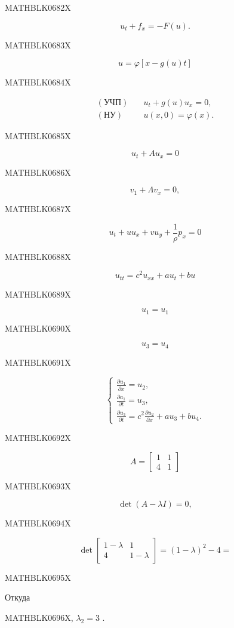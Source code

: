 \documentclass[
  ukrainian,
]{article}
\begin{document}
MATHBLK0682X

\[
u_t + f_x = -F(u).
\]

MATHBLK0683X

\[
u = \varphi[x-g(u)t]
\]

MATHBLK0684X

\[
\begin{aligned}
(\text{УЧП})\quad & u_t + g(u)u_x = 0,\\
(\text{НУ})\quad & u(x,0)=\varphi(x).
\end{aligned}
\]

MATHBLK0685X

\[
u_t + Au_x = 0
\]

MATHBLK0686X

\[
v_1 + \Lambda v_x = 0,
\]

MATHBLK0687X

\[
u_t + uu_x + vu_y + \frac{1}{\rho} p_x = 0
\]

MATHBLK0688X

\[
u_{tt} = c^2 u_{xx} + a u_t + b u
\]

MATHBLK0689X

\[
u_1 = u_1
\]

MATHBLK0690X

\[
u_3 = u_4
\]

MATHBLK0691X

\[
\begin{cases} \frac{\partial u_1}{\partial x} = u_2, \\ \frac{\partial a_1}{\partial t} = u_3, \\ \frac{\partial u_3}{\partial t} = c^2 \frac{\partial u_2}{\partial x} + au_3 + bu_4. \end{cases}
\]

MATHBLK0692X

\[
A = \begin{bmatrix} 1 & 1 \\ 4 & 1 \end{bmatrix}
\]

MATHBLK0693X

\[
\det\left(A-\lambda I\right)=0,
\]

MATHBLK0694X

\[
\det \begin{bmatrix} 1-\lambda & 1\\ 4 & 1-\lambda \end{bmatrix} = (1-\lambda)^2 - 4 =
\]

MATHBLK0695X

Откуда

MATHBLK0696X, \(\lambda_2 = 3\) .
\end{document}

